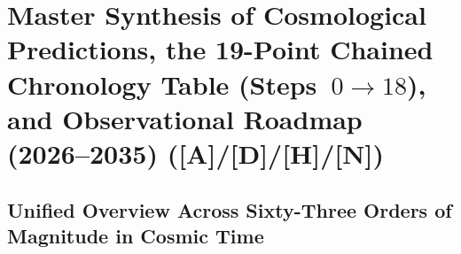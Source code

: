 \documentclass[11pt,a4paper]{article}
\newcommand{\catA}{\textbf{\textcolor{purple!80!black}{[A]}}}
\newcommand{\catD}{\textbf{\textcolor{blue!75!black}{[D]}}}
\newcommand{\catH}{\textbf{\textcolor{orange!85!black}{[H]}}}
\newcommand{\catN}{\textbf{\textcolor{teal!75!black}{[N]}}}
\theoremstyle{plain}
\theoremstyle{definition}
\theoremstyle{remark}
\numberwithin{equation}{section}
\begin{document}
\section{\texorpdfstring{Master Synthesis of Cosmological Predictions, the 19-Point Chained Chronology Table (Steps~$0 \to 18$), and Observational Roadmap (2026--2035) (\catA/\catD/\catH/\catN)}{Master Synthesis of Cosmological Predictions, the 19-Point Chained Chronology Table (Steps 0 -> 18), and Observational Roadmap (2026-2035)}}

\subsection{\texorpdfstring{Unified Overview Across Sixty-Three Orders of Magnitude in Cosmic Time}{Unified Overview Across Sixty-Three Orders of Magnitude in Cosmic Time}}
\end{document}
